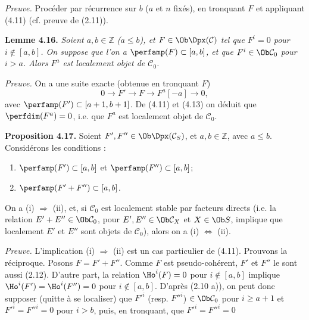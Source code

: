 \emph{Preuve.} Procéder par récurrence sur \(b\) (\(a\) et \(n\) fixés), en tronquant \(F\) et appliquant (4.11) (cf. preuve de (2.11)).

\textbf{Lemme 4.16.} \emph{Soient \(a,b\in\mathbb Z\) (\(a\leq b\)), et \(F\in\Ob\Dpx(\mathcal C)\) tel que \(F^i=0\) pour \(i\notin[a,b]\). On suppose que l'on a \(\perfamp(F)\subset[a,b]\), et que \(F^i\in\Ob\mathcal C_0\) pour \(i>a\). Alors \(F^a\) est localement objet de \(\mathcal C_0\).}

\emph{Preuve.} On a une suite exacte (obtenue en tronquant \(F\))
\[
  0\longrightarrow F'\longrightarrow F\longrightarrow F^a[-a]\longrightarrow 0,
\]
avec \(\perfamp(F')\subset[a+1,b+1]\). De (4.11) et (4.13) on déduit que \(\perfdim(F^a)=0\), i.e. que \(F^a\) est localement objet de \(\mathcal C_0\).

\textbf{Proposition 4.17.} Soient \(F',F''\in\Ob\Dpx(\mathcal C_S)\), et \(a,b\in\mathbb Z\), avec \(a\leq b\). Considérons les conditions :
\begin{enumerate}[label=(\roman*)]
\item \(\perfamp(F')\subset[a,b]\) et \(\perfamp(F'')\subset[a,b]\);
\item \(\perfamp(F'+F'')\subset[a,b]\).
\end{enumerate}
On a (i) \(\Rightarrow\) (ii), et, si \(\mathcal C_0\) est localement stable par facteurs directs (i.e. la relation \(E'+E''\in\Ob\mathcal C_0\), pour \(E',E''\in\Ob\mathcal C_X\) et \(X\in\Ob S\), implique que localement \(E'\) et \(E''\) sont objets de \(\mathcal C_0\)), alors on a (i) \(\Leftrightarrow\) (ii).

\emph{Preuve.} L'implication (i) \(\Rightarrow\) (ii) est un cas particulier de (4.11). Prouvons la réciproque. Posons \(F=F'+F''\). Comme \(F\) est pseudo-cohérent, \(F'\) et \(F''\) le sont aussi (2.12). D'autre part, la relation \(\Ho^i(F)=0\) pour \(i\notin[a,b]\) implique \(\Ho^i(F')=\Ho^i(F'')=0\) pour \(i\notin[a,b]\). D'après (2.10 a)), on peut donc supposer (quitte à se localiser) que \(F'^i\) (resp. \(F''^i\)) \(\in\Ob\mathcal C_0\) pour \(i\geq a+1\) et \(F'^i=F''^i=0\) pour \(i>b\), puis, en tronquant, que \(F'^i=F''^i=0\)
